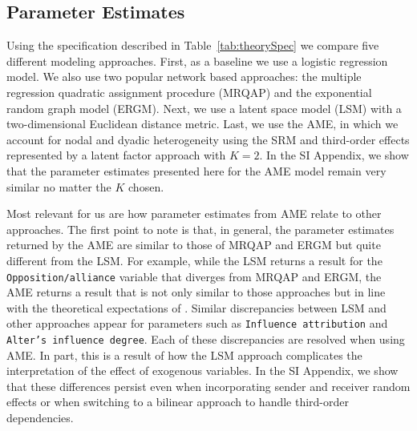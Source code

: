 \documentclass[9pt,twocolumn,twoside,lineno]{pnas-new}
\begin{document}
\subsection*{Parameter Estimates}

Using the specification described in Table~\ref{tab:theorySpec} we compare five different modeling approaches. First, as a baseline we use a logistic regression model. We also use two popular network based approaches: the multiple regression quadratic assignment procedure (MRQAP) and the exponential random graph model (ERGM). Next, we use a latent space model (LSM) with a two-dimensional Euclidean distance metric. Last, we use the AME, in which we account for nodal and dyadic heterogeneity using the SRM and third-order effects represented by a latent factor approach with $K=2$. In the SI Appendix, we show that the parameter estimates presented here for the AME model remain very similar no matter the $K$ chosen.

Most relevant for us are how parameter estimates from AME relate to other approaches. The first point to note is that, in general, the parameter estimates returned by the AME are similar to those of MRQAP and ERGM but quite different from the LSM. For example, while the LSM returns a result for the \texttt{Opposition/alliance} variable that diverges from MRQAP and ERGM, the AME returns a result that is not only similar to those approaches but in line with the theoretical expectations of \citet{ingold:fischer:2014}. Similar discrepancies between LSM and other approaches appear for parameters such as \texttt{Influence attribution} and \texttt{Alter's influence degree}. Each of these discrepancies are resolved when using AME. In part, this is a result of how the LSM approach complicates the interpretation of the effect of exogenous variables. In the SI Appendix, we show that these differences persist even when incorporating sender and receiver random effects or when switching to a bilinear approach to handle third-order dependencies.
\end{document}
